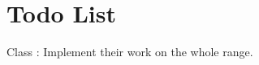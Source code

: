 \chapter{Todo List}
\hypertarget{todo}{}\label{todo}

\begin{DoxyRefList}
\item[Class \doxylink{classfort_1_1table_1_1cell__range}{fort\+::table\texorpdfstring{$<$}{<} TT \texorpdfstring{$>$}{>}\+::cell\+\_\+range} ]\label{todo__todo000001}%
%
\+: Implement their work on the whole range. 
\end{DoxyRefList}